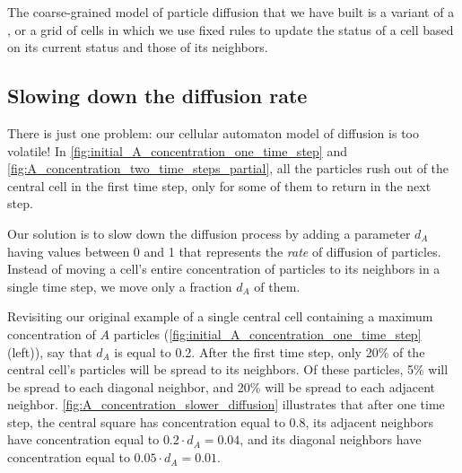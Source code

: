 \begin{qbox}\end{qbox}

The coarse-grained model of particle diffusion that we have built is a variant of a , or a grid of cells in which we use fixed rules to update the status of a cell based on its current status and those of its neighbors.\\

\FloatBarrier
{}
\subsection{Slowing down the diffusion rate}

There is just one problem: our cellular automaton model of diffusion is too volatile! In 
\autoref{fig:initial_A_concentration_one_time_step} and \autoref{fig:A_concentration_two_time_steps_partial}, all the particles rush out of the central cell in the first time step, only for some of them to return in the next step.

Our solution is to slow down the diffusion process by adding a parameter $d_A$ having values between 0 and 1 that represents the \textit{rate} of diffusion of  particles. Instead of moving a cell's entire concentration of particles to its neighbors in a single time step, we move only a fraction $d_A$ of them.

Revisiting our original example of a single central cell containing a maximum concentration of $A$ particles (\autoref{fig:initial_A_concentration_one_time_step} (left)), say that $d_A$ is equal to 0.2. After the first time step, only 20\% of the central cell's particles will be spread to its neighbors. Of these particles, 5\% will be spread to each diagonal neighbor, and 20\% will be spread to each adjacent neighbor. \autoref{fig:A_concentration_slower_diffusion} illustrates that after one time step, the central square has concentration equal to 0.8, its adjacent neighbors have concentration equal to $0.2 \cdot d_A = 0.04$, and its diagonal neighbors have concentration equal to $0.05 \cdot d_A = 0.01$.

